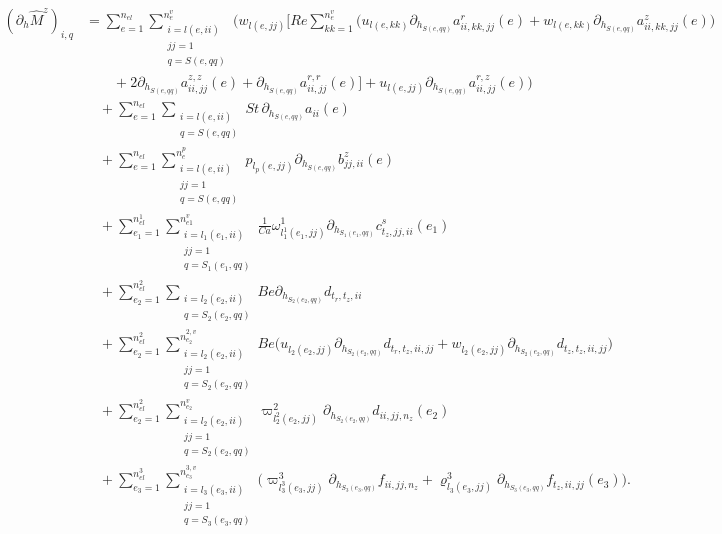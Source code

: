 \documentclass{article}
\begin{document}
\begin{align}
\left(\partial_h \hat{M}^z\right)_{i,q} &= 
\sum_{e=1}^{n_{el}} \sum_{\substack{i=l(e,ii)\\ jj=1\\ q=S(e,qq)}}^{n_e^v} \Bigg( w_{l(e,jj)} \Bigg[ Re \sum_{kk=1}^{n_e^v} \big( u_{l(e,kk)} \partial_{h_{S(e,qq)}} a_{ii,kk,jj}^r(e) + w_{l(e,kk)} \partial_{h_{S(e,qq)}} a_{ii,kk,jj}^z(e) \big) \nonumber\\
&\qquad + 2 \partial_{h_{S(e,qq)}} a_{ii,jj}^{z,z}(e) + \partial_{h_{S(e,qq)}} a_{ii,jj}^{r,r}(e) \Bigg] + u_{l(e,jj)} \partial_{h_{S(e,qq)}} a_{ii,jj}^{r,z}(e) \Bigg) \nonumber\\
&\quad + \sum_{e=1}^{n_{el}} \sum_{\substack{i=l(e,ii)\\ q=S(e,qq)}} St \, \partial_{h_{S(e,qq)}} a_{ii}(e) \nonumber\\
&\quad + \sum_{e=1}^{n_{el}} \sum_{\substack{i=l(e,ii)\\ jj=1\\ q=S(e,qq)}}^{n_e^p} p_{l_p(e,jj)} \partial_{h_{S(e,qq)}} b_{jj,ii}^z(e) \nonumber\\
&\quad + \sum_{e_1=1}^{n_{el}^1} \sum_{\substack{i=l_1(e_1,ii)\\ jj=1\\ q=S_1(e_1,qq)}}^{n_{e1}^v} \frac{1}{Ca} \omega_{l_1^1(e_1,jj)}^1 \partial_{h_{S_1(e_1,qq)}} c_{t_z,jj,ii}^s(e_1) \nonumber\\
&\quad + \sum_{e_2=1}^{n_{el}^2} \sum_{\substack{i=l_2(e_2,ii)\\ q=S_2(e_2,qq)}} Be \partial_{h_{S_2(e_2,qq)}} d_{t_r,t_z,ii} \nonumber\\
&\quad + \sum_{e_2=1}^{n_{el}^2} \sum_{\substack{i=l_2(e_2,ii)\\ jj=1\\ q=S_2(e_2,qq)}}^{n_{e_2}^{2,v}} Be \Big( u_{l_2(e_2,jj)} \partial_{h_{S_2(e_2,qq)}} d_{t_r,t_z,ii,jj} + w_{l_2(e_2,jj)} \partial_{h_{S_2(e_2,qq)}} d_{t_z,t_z,ii,jj} \Big) \nonumber\\
&\quad + \sum_{e_2=1}^{n_{el}^2} \sum_{\substack{i=l_2(e_2,ii)\\ jj=1\\ q=S_2(e_2,qq)}}^{n_{e_2}^v} \varpi_{l_2^2(e_2,jj)}^2 \partial_{h_{S_2(e_2,qq)}} d_{ii,jj,n_z}(e_2) \nonumber\\
&\quad + \sum_{e_3=1}^{n_{el}^3} \sum_{\substack{i=l_3(e_3,ii)\\ jj=1\\ q=S_3(e_3,qq)}}^{n_{e_3}^{3,v}} \Big( \varpi_{l_3^3(e_3,jj)}^3 \partial_{h_{S_3(e_3,qq)}} f_{ii,jj,n_z} + \varrho_{l_3(e_3,jj)}^3 \partial_{h_{S_3(e_3,qq)}} f_{t_z,ii,jj}(e_3) \Big). \tag{18.15}
\end{align}
\end{document}
